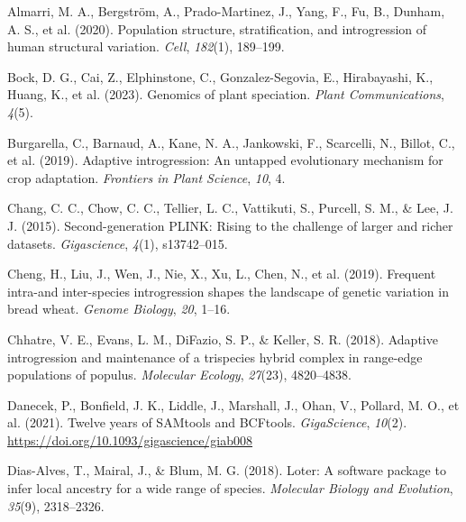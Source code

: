 \documentclass[
]{agujournal2019}
\newlength{\cslhangindent}
\newenvironment{CSLReferences}[2] %
 {\begin{list}{}{%
  \setlength{\itemindent}{0pt}
  \setlength{\leftmargin}{0pt}
  \setlength{\parsep}{0pt}
  \ifodd #1
   \setlength{\leftmargin}{\cslhangindent}
   \setlength{\itemindent}{-1\cslhangindent}
  \fi
  \setlength{\itemsep}{#2\baselineskip}}}
 {\end{list}}
\begin{document}
\label{refs}
\begin{CSLReferences}{1}{0}
\vspace{1em}

Almarri, M. A., Bergström, A., Prado-Martinez, J., Yang, F., Fu, B.,
Dunham, A. S., et al. (2020). Population structure, stratification, and
introgression of human structural variation. \emph{Cell}, \emph{182}(1),
189--199.

Bock, D. G., Cai, Z., Elphinstone, C., Gonzalez-Segovia, E.,
Hirabayashi, K., Huang, K., et al. (2023). Genomics of plant speciation.
\emph{Plant Communications}, \emph{4}(5).

Burgarella, C., Barnaud, A., Kane, N. A., Jankowski, F., Scarcelli, N.,
Billot, C., et al. (2019). Adaptive introgression: An untapped
evolutionary mechanism for crop adaptation. \emph{Frontiers in Plant
Science}, \emph{10}, 4.

Chang, C. C., Chow, C. C., Tellier, L. C., Vattikuti, S., Purcell, S.
M., \& Lee, J. J. (2015). Second-generation PLINK: Rising to the
challenge of larger and richer datasets. \emph{Gigascience},
\emph{4}(1), s13742--015.

Cheng, H., Liu, J., Wen, J., Nie, X., Xu, L., Chen, N., et al. (2019).
Frequent intra-and inter-species introgression shapes the landscape of
genetic variation in bread wheat. \emph{Genome Biology}, \emph{20},
1--16.

Chhatre, V. E., Evans, L. M., DiFazio, S. P., \& Keller, S. R. (2018).
Adaptive introgression and maintenance of a trispecies hybrid complex in
range-edge populations of populus. \emph{Molecular Ecology},
\emph{27}(23), 4820--4838.

Danecek, P., Bonfield, J. K., Liddle, J., Marshall, J., Ohan, V.,
Pollard, M. O., et al. (2021). Twelve years of SAMtools and BCFtools.
\emph{GigaScience}, \emph{10}(2).
\url{https://doi.org/10.1093/gigascience/giab008}

Dias-Alves, T., Mairal, J., \& Blum, M. G. (2018). Loter: A software
package to infer local ancestry for a wide range of species.
\emph{Molecular Biology and Evolution}, \emph{35}(9), 2318--2326.


\end{CSLReferences}
\end{document}
